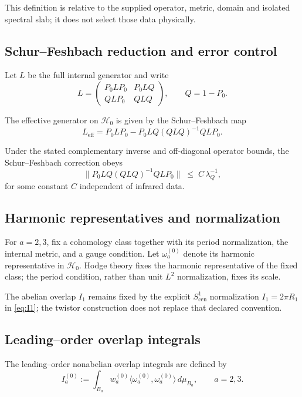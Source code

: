 \documentclass[11pt]{article}
\begin{document}
This definition is relative to the supplied operator, metric, domain and
isolated spectral slab; it does not select those data physically.

\subsection{Schur--Feshbach reduction and error control}

Let $L$ be the full internal generator and write
\[
L =
\begin{pmatrix}
P_0 L P_0 & P_0 L Q \\
Q L P_0 & Q L Q
\end{pmatrix},
\qquad Q=1-P_0.
\]

The effective generator on $\mathcal H_0$ is given by the Schur--Feshbach map
\[
L_{\mathrm{eff}}
=
P_0 L P_0
-
P_0 L Q (Q L Q)^{-1} Q L P_0.
\]

Under the stated complementary inverse and off-diagonal operator bounds,
the Schur--Feshbach correction obeys
\[
\|P_0 L Q (Q L Q)^{-1} Q L P_0\|
\;\le\;
C\,\lambda_Q^{-1},
\]
for some constant $C$ independent of infrared data.

\subsection{Harmonic representatives and normalization}

\begin{definition}
For $a=2,3$, fix a cohomology class together with its period normalization,
the internal metric, and a gauge condition. Let $\omega_a^{(0)}$ denote its
harmonic representative in $\mathcal H_0$. Hodge theory fixes the harmonic
representative of the fixed class; the period condition, rather than unit
$L^2$ normalization, fixes its scale.
\end{definition}

\begin{remark}
The abelian overlap $I_1$ remains fixed by the explicit $S^1_{\mathrm{cen}}$
normalization $I_1=2\pi R_1$ in \eqref{eq:I1}; the twistor construction does
not replace that declared convention.
\end{remark}

\subsection{Leading--order overlap integrals}

\begin{definition}
The leading--order nonabelian overlap integrals are defined by
\[
I_a^{(0)} := \int_{B_a}
w_a^{(0)}
\langle \omega_a^{(0)}, \omega_a^{(0)} \rangle \, d\mu_{B_a},
\qquad a=2,3.
\]
\end{definition}
\end{document}
